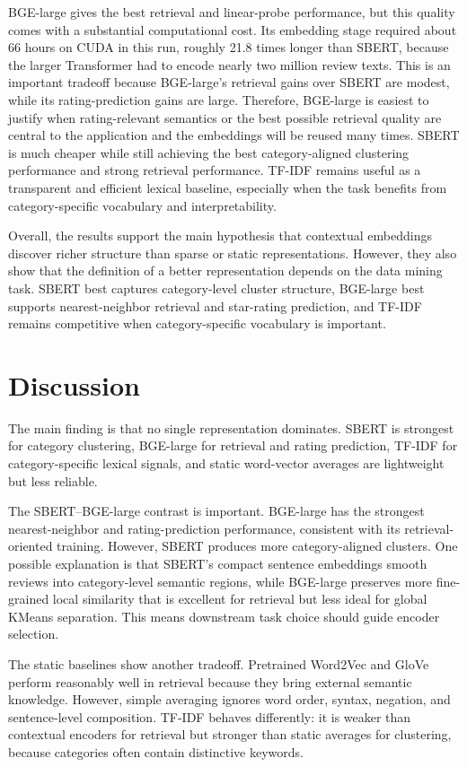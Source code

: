 \documentclass{article}
\begin{document}
BGE-large gives the best retrieval and linear-probe performance, but this quality comes with a substantial computational cost. Its embedding stage required about 66 hours on CUDA in this run, roughly 21.8 times longer than SBERT, because the larger Transformer had to encode nearly two million review texts. This is an important tradeoff because BGE-large's retrieval gains over SBERT are modest, while its rating-prediction gains are large. Therefore, BGE-large is easiest to justify when rating-relevant semantics or the best possible retrieval quality are central to the application and the embeddings will be reused many times. SBERT is much cheaper while still achieving the best category-aligned clustering performance and strong retrieval performance. TF-IDF remains useful as a transparent and efficient lexical baseline, especially when the task benefits from category-specific vocabulary and interpretability.

Overall, the results support the main hypothesis that contextual embeddings discover richer structure than sparse or static representations. However, they also show that the definition of a better representation depends on the data mining task. SBERT best captures category-level cluster structure, BGE-large best supports nearest-neighbor retrieval and star-rating prediction, and TF-IDF remains competitive when category-specific vocabulary is important.

\section{Discussion}
The main finding is that no single representation dominates. SBERT is strongest for category clustering, BGE-large for retrieval and rating prediction, TF-IDF for category-specific lexical signals, and static word-vector averages are lightweight but less reliable.

The SBERT--BGE-large contrast is important. BGE-large has the strongest nearest-neighbor and rating-prediction performance, consistent with its retrieval-oriented training. However, SBERT produces more category-aligned clusters. One possible explanation is that SBERT's compact sentence embeddings smooth reviews into category-level semantic regions, while BGE-large preserves more fine-grained local similarity that is excellent for retrieval but less ideal for global KMeans separation. This means downstream task choice should guide encoder selection.

The static baselines show another tradeoff. Pretrained Word2Vec and GloVe perform reasonably well in retrieval because they bring external semantic knowledge. However, simple averaging ignores word order, syntax, negation, and sentence-level composition. TF-IDF behaves differently: it is weaker than contextual encoders for retrieval but stronger than static averages for clustering, because categories often contain distinctive keywords.
\end{document}
